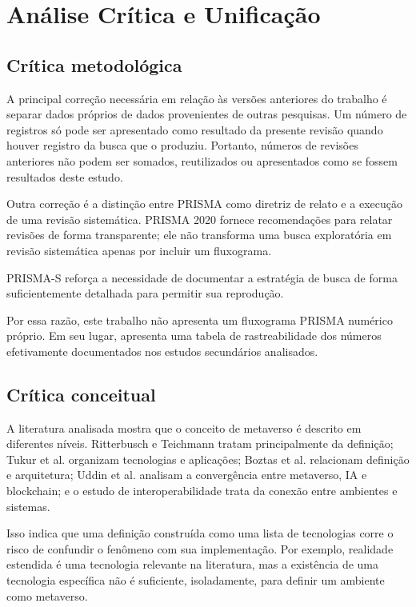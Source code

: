 \chapter{Análise Crítica e Unificação}
\label{cha:critica}

\section{Crítica metodológica}

A principal correção necessária em relação às versões anteriores do trabalho é separar dados próprios de dados provenientes de outras pesquisas. Um número de registros só pode ser apresentado como resultado da presente revisão quando houver registro da busca que o produziu. Portanto, números de revisões anteriores não podem ser somados, reutilizados ou apresentados como se fossem resultados deste estudo.

Outra correção é a distinção entre PRISMA como diretriz de relato e a execução de uma revisão sistemática. PRISMA 2020 fornece recomendações para relatar revisões de forma transparente; ele não transforma uma busca exploratória em revisão sistemática apenas por incluir um fluxograma. \cite{page2021}

PRISMA-S reforça a necessidade de documentar a estratégia de busca de forma suficientemente detalhada para permitir sua reprodução. \cite{rethlefsen2021}

Por essa razão, este trabalho não apresenta um fluxograma PRISMA numérico próprio. Em seu lugar, apresenta uma tabela de rastreabilidade dos números efetivamente documentados nos estudos secundários analisados.

\section{Crítica conceitual}

A literatura analisada mostra que o conceito de metaverso é descrito em diferentes níveis. Ritterbusch e Teichmann tratam principalmente da definição; Tukur et al. organizam tecnologias e aplicações; Boztas et al. relacionam definição e arquitetura; Uddin et al. analisam a convergência entre metaverso, IA e blockchain; e o estudo de interoperabilidade trata da conexão entre ambientes e sistemas. \cite{ritterbusch2023,tukur2024,boztas2025,uddin2024,yang2025}

Isso indica que uma definição construída como uma lista de tecnologias corre o risco de confundir o fenômeno com sua implementação. Por exemplo, realidade estendida é uma tecnologia relevante na literatura, mas a existência de uma tecnologia específica não é suficiente, isoladamente, para definir um ambiente como metaverso.


